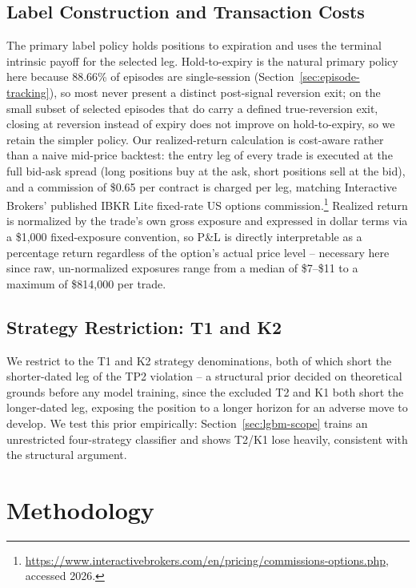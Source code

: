 \documentclass[sigconf,review]{acmart}
\begin{document}
\subsection{Label Construction and Transaction Costs}
\label{sec:labels}
The primary label policy holds positions to expiration and uses the terminal intrinsic payoff for the selected leg. Hold-to-expiry is the natural primary policy here because 88.66\% of episodes are single-session (Section~\ref{sec:episode-tracking}), so most never present a distinct post-signal reversion exit; on the small subset of selected episodes that do carry a defined true-reversion exit, closing at reversion instead of expiry does not improve on hold-to-expiry, so we retain the simpler policy. Our realized-return calculation is cost-aware rather than a naive mid-price backtest: the entry leg of every trade is executed at the full bid-ask spread (long positions buy at the ask, short positions sell at the bid), and a commission of \$0.65 per contract is charged per leg, matching Interactive Brokers' published IBKR Lite fixed-rate US options commission.\footnote{\url{https://www.interactivebrokers.com/en/pricing/commissions-options.php}, accessed 2026.} Realized return is normalized by the trade's own gross exposure and expressed in dollar terms via a \$1{,}000 fixed-exposure convention, so P\&L is directly interpretable as a percentage return regardless of the option's actual price level -- necessary here since raw, un-normalized exposures range from a median of \$7--\$11 to a maximum of \$814{,}000 per trade.

\subsection{Strategy Restriction: T1 and K2}
We restrict to the T1 and K2 strategy denominations, both of which short the shorter-dated leg of the TP2 violation -- a structural prior decided on theoretical grounds before any model training, since the excluded T2 and K1 both short the longer-dated leg, exposing the position to a longer horizon for an adverse move to develop. We test this prior empirically: Section~\ref{sec:lgbm-scope} trains an unrestricted four-strategy classifier and shows T2/K1 lose heavily, consistent with the structural argument.

\section{Methodology}
\label{sec:method}
\end{document}
